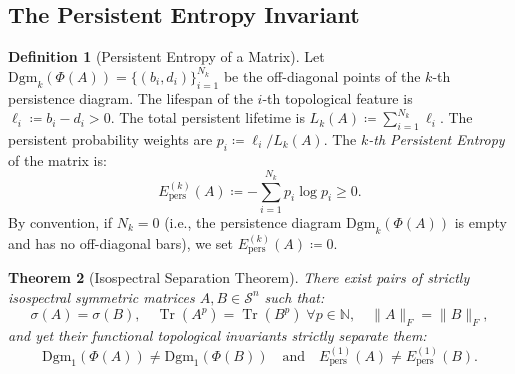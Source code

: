 \documentclass[11pt,a4paper,reqno]{amsart}
\newtheorem{theorem}{Theorem}[section]
\theoremstyle{definition}
\newtheorem{definition}[theorem]{Definition}
\numberwithin{equation}{section}
\newcommand{\Tr}{\operatorname{Tr}}
\begin{document}
\subsection{The Persistent Entropy Invariant}
\begin{definition}[Persistent Entropy of a Matrix]
Let $\mathrm{Dgm}_k(\Phi(A)) = \{(b_i, d_i)\}_{i=1}^{N_k}$ be the off-diagonal points of the $k$-th persistence diagram. The lifespan of the $i$-th topological feature is $\ell_i \coloneqq b_i - d_i > 0$. The total persistent lifetime is $L_k(A) \coloneqq \sum_{i=1}^{N_k} \ell_i$. The persistent probability weights are $p_i \coloneqq \ell_i / L_k(A)$.
The \emph{$k$-th Persistent Entropy} of the matrix is:
\begin{equation}
    E_{\mathrm{pers}}^{(k)}(A) \coloneqq -\sum_{i=1}^{N_k} p_i \log p_i \ge 0.
\end{equation}
By convention, if $N_k = 0$ (i.e., the persistence diagram $\mathrm{Dgm}_k(\Phi(A))$ is empty and has no off-diagonal bars), we set $E_{\mathrm{pers}}^{(k)}(A) \coloneqq 0$.
\end{definition}

\begin{theorem}[Isospectral Separation Theorem]
\label{thm:isospectral_separation}
There exist pairs of strictly isospectral symmetric matrices $A, B \in \mathcal{S}^n$ such that:
\begin{equation}
    \sigma(A) = \sigma(B), \quad \Tr(A^p) = \Tr(B^p) \; \forall p \in \mathbb{N}, \quad \|A\|_F = \|B\|_F,
\end{equation}
and yet their functional topological invariants strictly separate them:
\begin{equation}
    \mathrm{Dgm}_1(\Phi(A)) \ne \mathrm{Dgm}_1(\Phi(B)) \quad \text{and} \quad E_{\mathrm{pers}}^{(1)}(A) \ne E_{\mathrm{pers}}^{(1)}(B).
\end{equation}
\end{theorem}
\end{document}
